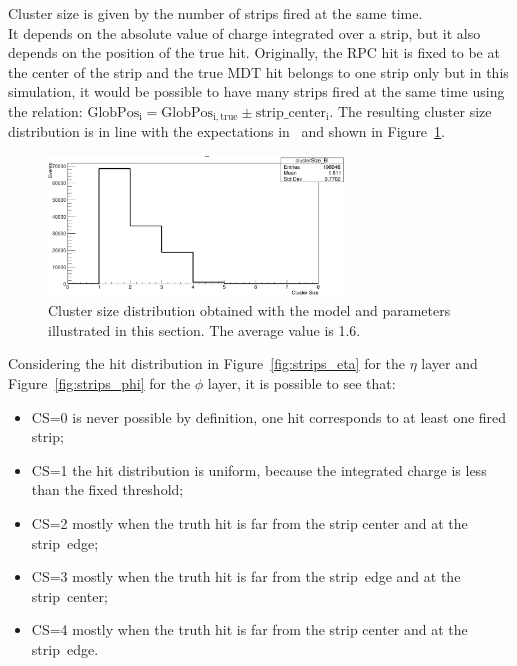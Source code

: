 Cluster size is given by the number of strips fired at the same time. \\
It depends on the absolute value of charge integrated over a strip, but it also depends on the position of the true hit.
Originally, the RPC hit is fixed to be at the center of the strip and the true MDT hit belongs to one strip only but in this simulation, it would be possible to have many strips fired at the same time using the relation: $\mathrm{GlobPos_{i} = GlobPos_{i,true}\pm strip\_center_{i}}$. 
The resulting cluster size distribution is in line with the expectations in~\cite{TDR} and shown in Figure~\ref{fig:CS}.
\begin{figure}[!h]
	\centering
	\includegraphics[width=0.7\textwidth]{Chapters/CH3/figures/CS}
	\caption{Cluster size distribution obtained with the model and parameters illustrated in this section. The average value is 1.6.}
	\label{fig:CS}
\end{figure}
\newpage\phantom{}
\noindent Considering the hit distribution in Figure~\ref{fig:strips_eta} for the $\eta$ layer and Figure~\ref{fig:strips_phi} for the $\phi$ layer, it is possible to see that:
\begin{itemize}
\item CS=0 is never possible by definition, one hit corresponds to at least one fired strip;
\item CS=1 the hit distribution is uniform, because the integrated charge is less than the fixed threshold;
\item CS=2 mostly when the truth hit is far from the strip center and at the strip~edge;
\item CS=3 mostly when the truth hit is far from the strip~edge and at the strip~center;
\item CS=4 mostly when the truth hit is far from the strip center and at the strip~edge.
\end{itemize}
